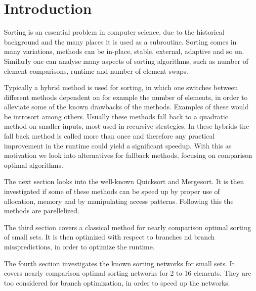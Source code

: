 \section{Introduction}
Sorting is an essential problem in computer science, due to the historical background and the many places it is used as a subroutine. Sorting comes in many variations, methods can be in-place, stable, external, adaptive and so on. Similarly one can analyse many aspects of sorting algorithms, such as number of element comparisons, runtime and number of element swaps.

Typically a hybrid method is used for sorting, in which one switches between different methods dependent on for example the number of elements, in order to alleviate some of the known drawbacks of the methods. Examples of these would be introsort\cite{m97} among others. Usually these methods fall back to a quadratic method on smaller inputs, most used in recursive strategies. In these hybrids the fall back method is called more than once and therefore any practical improvement in the runtime could yield a significant speedup. With this as motivation we look into alternatives for fallback methods, focusing on comparison optimal algorithms.


The next section looks into the well-known Quicksort and Mergesort. It is then investigated if some of these methods can be speed up by proper use of allocation, memory and by manipulating access patterns. Following this the methods are parellelized.

The third section covers a classical method for nearly comparison optimal sorting of small sets. It is then optimized with respect to branches nd branch misspredictions, in order to optimize the runtime.

The fourth section investigates the known sorting networks for small sets. It covers nearly comparison optimal sorting networks for 2 to 16 elements. They are too considered for branch optimization, in order to speed up the networks.

